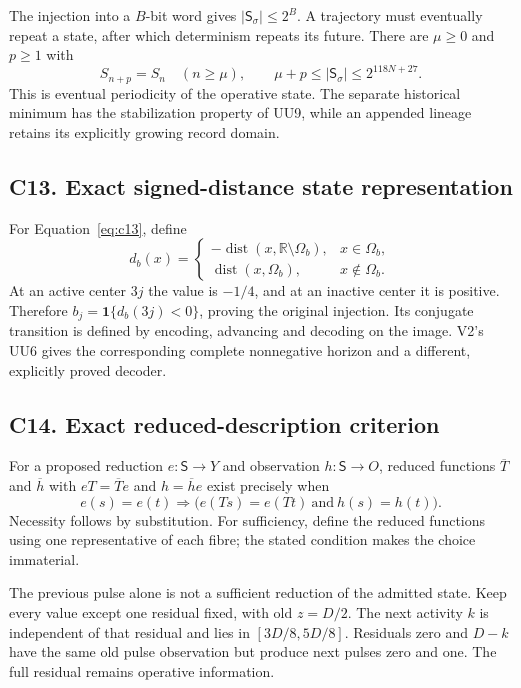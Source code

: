 \documentclass[11pt,a4paper]{article}
\numberwithin{equation}{section}
\newcommand{\ind}{\mathbf 1}
\newcommand{\dist}{\operatorname{dist}}
\begin{document}
The injection into a $B$-bit word gives $|\mathsf S_\sigma|\le2^B$. A trajectory must eventually repeat a state, after which determinism repeats its future. There are $\mu\ge0$ and $p\ge1$ with
\begin{equation}
S_{n+p}=S_n\quad(n\ge\mu),
\qquad \mu+p\le|\mathsf S_\sigma|\le2^{118N+27}.
\end{equation}
This is eventual periodicity of the operative state. The separate historical minimum has the stabilization property of UU9, while an appended lineage retains its explicitly growing record domain.

\subsection*{C13. Exact signed-distance state representation}
For Equation~\eqref{eq:c13}, define
\begin{equation}
d_b(x)=\begin{cases}
-\dist(x,\mathbb R\setminus\Omega_b),&x\in\Omega_b,\\
\dist(x,\Omega_b),&x\notin\Omega_b.
\end{cases}
\end{equation}
At an active center $3j$ the value is $-1/4$, and at an inactive center it is positive. Therefore $b_j=\ind\{d_b(3j)<0\}$, proving the original injection. Its conjugate transition is defined by encoding, advancing and decoding on the image. V2's UU6 gives the corresponding complete nonnegative horizon and a different, explicitly proved decoder.

\subsection*{C14. Exact reduced-description criterion}
For a proposed reduction $e:\mathsf S\to Y$ and observation $h:\mathsf S\to O$, reduced functions $\overline T$ and $\overline h$ with $eT=\overline Te$ and $h=\overline he$ exist precisely when
\begin{equation}
e(s)=e(t)\Longrightarrow
\big(e(Ts)=e(Tt)\ \text{and}\ h(s)=h(t)\big).
\end{equation}
Necessity follows by substitution. For sufficiency, define the reduced functions using one representative of each fibre; the stated condition makes the choice immaterial.

The previous pulse alone is not a sufficient reduction of the admitted state. Keep every value except one residual fixed, with old $z=D/2$. The next activity $k$ is independent of that residual and lies in $[3D/8,5D/8]$. Residuals zero and $D-k$ have the same old pulse observation but produce next pulses zero and one. The full residual remains operative information.
\end{document}
